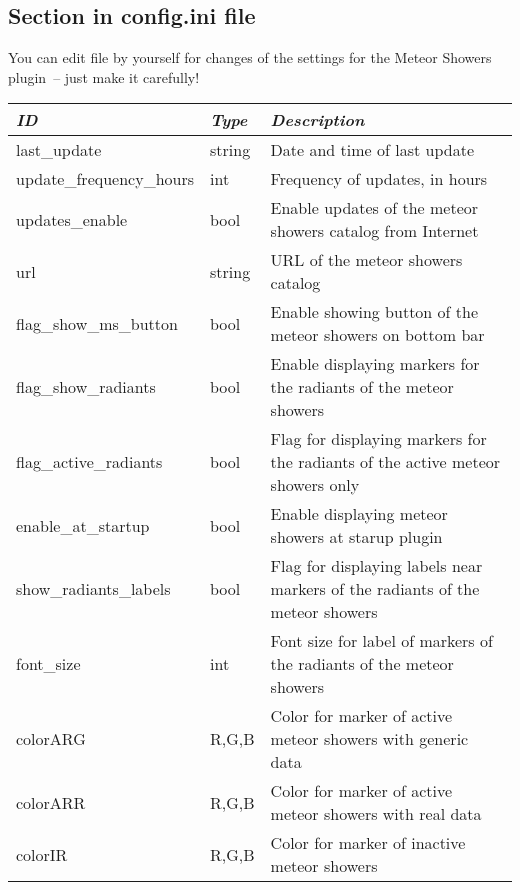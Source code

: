 \subsection{Section  in config.ini file}

You can edit  file by yourself for changes of the
settings for the Meteor Showers plugin~-- just make it carefully!

\noindent%
\begin{tabularx}{\textwidth}{l|l|X}\toprule
\emph{ID}            & \emph{Type} & \emph{Description}\\\midrule
last\_update          & string & Date and time of last update \\%
update\_frequency\_hours & int & Frequency of updates, in hours \\%
updates\_enable         & bool & Enable updates of the meteor showers catalog from Internet \\%
url                   & string & URL of the meteor showers catalog \\%
flag\_show\_ms\_button  & bool & Enable showing button of the meteor showers on bottom bar \\%
flag\_show\_radiants    & bool & Enable displaying markers for the radiants of the meteor showers \\%
flag\_active\_radiants  & bool & Flag for displaying markers for the radiants of the active meteor showers only \\%
enable\_at\_startup     & bool & Enable displaying meteor showers at starup plugin \\%
show\_radiants\_labels  & bool & Flag for displaying labels near markers of the radiants of the meteor showers \\%
font\_size              & int  & Font size for label of markers of the radiants of the meteor showers \\%
colorARG               & R,G,B & Color for marker of active meteor showers with generic data \\%
colorARR               & R,G,B & Color for marker of active meteor showers with real data \\%
colorIR                & R,G,B & Color for marker of inactive meteor showers \\\bottomrule
\end{tabularx}


